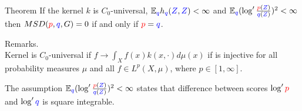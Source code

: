 \begin{frame}
\begin{columns}
\begin{column}{.33\linewidth}
\begin{block}{Theorem}
\large
If the kernel $k$ is $C_0$-universal, $\mathbb{E}_{{ \color{blue} { \color{blue} q}}} h_{{ \color{blue} { \color{blue} q}}}({ \color{blue} Z},{ \color{blue} Z})<\infty$ and $\mathbb{E}_{{ \color{blue} { \color{blue} q}}} (\log' \frac{{\color{red} p}({ \color{blue} Z})}{{ \color{blue} q}({ \color{blue} Z})})^{2}<\infty$
then $MSD({\color{red} p},{ \color{blue} q},G) =0$ if and only if ${\color{red} p}={ \color{blue} q}$.

\vspace{1cm}
\normalsize
Remarks.\\
Kernel is $C_0$-universal if  $f \to \int_X f(x) k(x,\cdot) d\mu(x)$ if is injective for all probability measures $\mu$ and all  $f \in L^p(X,\mu)$, where  $p \in [1,\infty] $. 
\vspace{0.5cm}

The assumption $\mathbb{E}_{{ \color{blue} q}} (\log' \frac{{\color{red} p}({ \color{blue} Z})}{{ \color{blue} q}({ \color{blue} Z})})^{2}<\infty$ states that difference between scores $\log' \color{red} p$ and $\log' \color{blue} q$  is square integrable.
\end{block}


\end{column}
\end{columns}
\end{frame}
